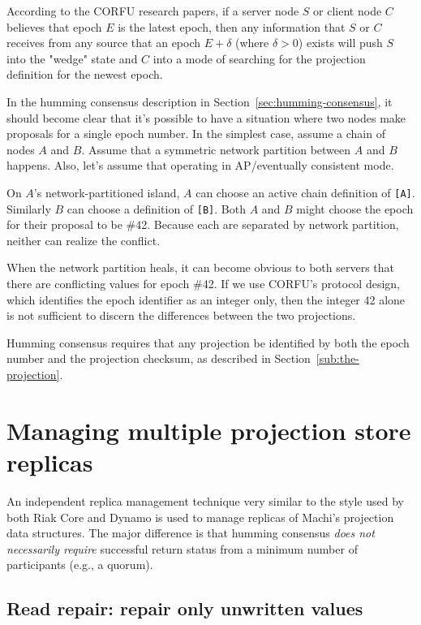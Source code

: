 \documentclass[preprint,10pt]{sigplanconf}
\begin{document}
According to the CORFU research papers, if a server node $S$ or client
node $C$ believes that epoch $E$ is the latest epoch, then any information
that $S$ or $C$ receives from any source that an epoch $E+\delta$ (where
$\delta > 0$) exists will push $S$ into the "wedge" state and $C$ into a mode
of searching for the projection definition for the newest epoch.

In the humming consensus description in
Section~\ref{sec:humming-consensus}, it should become clear that it's
possible to have a situation where two nodes make proposals
for a single epoch number.  In the simplest case, assume a chain of
nodes $A$ and $B$.  Assume that a symmetric network partition between
$A$ and $B$ happens. Also, let's assume that operating in
AP/eventually consistent mode.

On $A$'s network-partitioned island, $A$ can choose
an active chain definition of {\tt [A]}.
Similarly $B$ can choose a definition of {\tt [B]}.  Both $A$ and $B$
might choose the
epoch for their proposal to be \#42.  Because each are separated by
network partition, neither can realize the conflict.

When the network partition heals, it can become obvious to both
servers that there are conflicting values for epoch \#42.  If we
use CORFU's protocol design, which identifies the epoch identifier as
an integer only, then the integer 42 alone is not sufficient to
discern the differences between the two projections.

Humming consensus requires that any projection be identified by both
the epoch number and the projection checksum, as described in
Section~\ref{sub:the-projection}.

\section{Managing multiple projection store replicas}
\label{sec:managing-multiple-projection-stores}

An independent replica management technique very similar to the style
used by both Riak Core \cite{riak-core} and Dynamo is used to manage
replicas of Machi's projection data structures.
The major difference is that humming consensus
{\em does not necessarily require}
successful return status from a minimum number of participants (e.g.,
a quorum).

\subsection{Read repair: repair only unwritten values}
\end{document}
